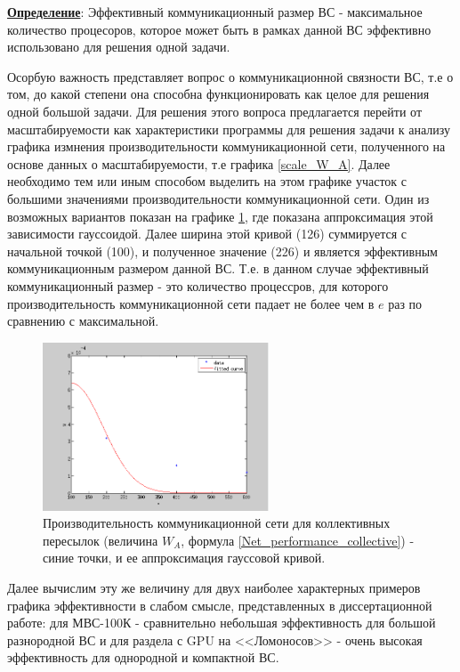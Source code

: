      \underline{\textbf{Определение}}: Эффективный коммуникационный размер ВС - максимальное количество процесоров, которое может быть в рамках данной ВС эффективно использовано для решения одной задачи.  
     
     
     
     Осорбую важность представляет вопрос о коммуникационной связности ВС, т.е о том, до какой степени она способна функционировать как целое для решения одной большой задачи. Для решения этого вопроса предлагается перейти от масштабируемости как характеристики программы для решения задачи к анализу графика измнения производительности коммуникационной сети, полученного на основе данных о масштабируемости, т.е графика \ref{scale_W_A}. Далее необходимо тем или иным способом выделить на этом графике участок с большими значениями производительности коммуникационной сети.
     Один из возможных вариантов показан на графике \ref{scale_W_A_exp}, где показана аппроксимация этой зависимости гауссоидой. Далее ширина этой кривой (126) суммируется с начальной точкой (100), и полученное значение (226) и является эффективным коммуникационным размером данной ВС. Т.е. в данном случае эффективный коммуникационный размер - это количество процессров, для которого производительность коммуникационной сети падает не более чем в $e$ раз по сравнению с максимальной.
     
     
\begin{figure}[h]
	
	
	\begin{center}
		\includegraphics[height=5cm,keepaspectratio]{images/scaleNSU_exp_fit.png}
		\caption{
			Производительность коммуникационной сети для коллективных пересылок (величина $W_A$, формула \ref{Net_performance_collective}) - синие точки, и ее аппроксимация гауссовой кривой. 
		}
		\label{scale_W_A_exp}
	\end{center} 
\end{figure}

Далее вычислим эту же величину для двух наиболее характерных примеров графика эффективности в слабом смысле, представленных в диссертационной работе: для МВС-100К - сравнительно небольшая эффективность для большой разнородной ВС и для раздела с GPU на <<Ломоносов>> - очень высокая эффективность для однородной и компактной ВС. 


